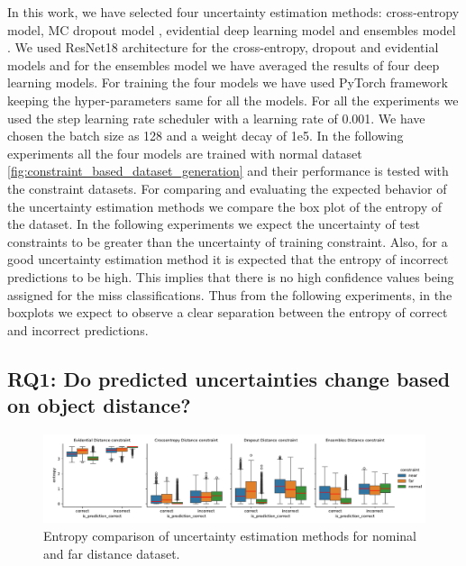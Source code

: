   In this work, we have selected four uncertainty estimation methods: cross-entropy model, MC dropout model \cite{gal2016dropout}, evidential deep learning model \cite{sensoy2018evidential} and ensembles model \cite{lakshminarayanan2017simple}. We used ResNet18 architecture for the cross-entropy, dropout and evidential models and for the ensembles model we have averaged the results of four deep learning models. For training the four models we have used PyTorch framework keeping the hyper-parameters same for all the models. For all the experiments we used the step learning rate scheduler with a learning rate of 0.001. We have chosen the batch size as 128 and a weight decay of 1e5. In the following experiments all the four models are trained with normal dataset 
 \ref{fig:constraint_based_dataset_generation} and their performance is tested with the constraint datasets. For comparing and evaluating the expected behavior of the uncertainty estimation methods we compare the box plot of the entropy of the dataset. 
 In the following experiments we expect the uncertainty of test constraints to be greater than the uncertainty of training constraint. Also, for a good uncertainty estimation method it is expected that the entropy of incorrect predictions to be high. This implies that there is no high confidence values being assigned for the miss classifications. Thus from the following experiments, in the boxplots we expect to observe a clear separation between the entropy of correct and incorrect predictions.

\subsection{RQ1: Do predicted uncertainties change based on object distance?}


\begin{figure}[t]
	\centering
	\includegraphics[width=\textwidth]{images/distance_boxplot.pdf}
	\caption{Entropy comparison of uncertainty estimation methods for nominal and far distance dataset.}
	\label{fig:entropy_far}
\end{figure}

